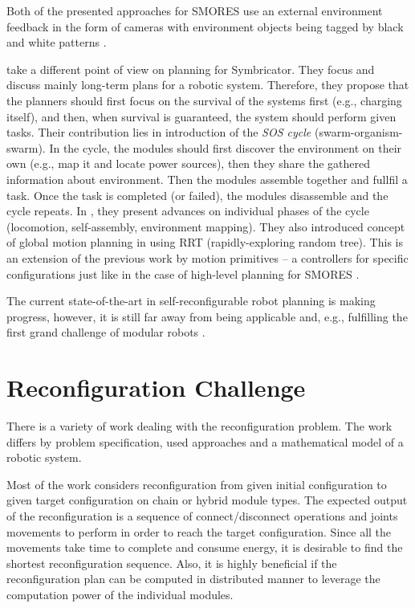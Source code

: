 Both of the presented approaches for SMORES use an external environment feedback
in the form of cameras with environment objects being tagged by black and white
patterns \cite{DBLP:journals/scirobotics/JingTYKC18}.

\textcite{DBLP:conf/syscon/LeviMRKVSLC14} take a different point of view on
planning for Symbricator. They focus and discuss mainly long-term plans for a
robotic system. Therefore, they propose that the planners should first focus on
the survival of the systems first (e.g., charging itself), and then, when
survival is guaranteed, the system should perform given tasks. Their
contribution lies in introduction of the \emph{SOS cycle}
(swarm-organism-swarm). In the cycle, the modules should first discover the
environment on their own (e.g., map it and locate power sources), then they
share the gathered information about environment. Then the modules assemble
together and fullfil a task. Once the task is completed (or failed), the modules
disassemble and the cycle repeats. In \cite{DBLP:conf/syscon/LeviMRKVSLC14},
they present advances on individual phases of the cycle (locomotion,
self-assembly, environment mapping). They also introduced concept of global
motion planning in \cite{DBLP:conf/icra/VonasekSKP13} using RRT
(rapidly-exploring random tree). This is an extension of the previous work
\cite{DBLP:conf/taros/VonasekKP12} by motion primitives -- a controllers for
specific configurations just like in the case of high-level planning for SMORES
\cite{DBLP:journals/arobots/JingTYK18}.

The current state-of-the-art in self-reconfigurable robot planning is making
progress, however, it is still far away from being applicable and, e.g.,
fulfilling the first grand challenge of modular robots
\cite{DBLP:journals/corr/abs-1108-5543}.

\section{Reconfiguration Challenge}\label{sec:chal-reconfig}

There is a variety of work dealing with the reconfiguration problem. The work
differs by problem specification, used approaches and a mathematical model of a
robotic system.

Most of the work considers reconfiguration from given initial configuration to
given target configuration on chain or hybrid module types. The expected output
of the reconfiguration is a sequence of connect/disconnect operations and joints
movements to perform in order to reach the target configuration. Since all the
movements take time to complete and consume energy, it is desirable to find the
shortest reconfiguration sequence. Also, it is highly beneficial if the
reconfiguration plan can be computed in distributed manner to leverage the
computation power of the individual modules.

